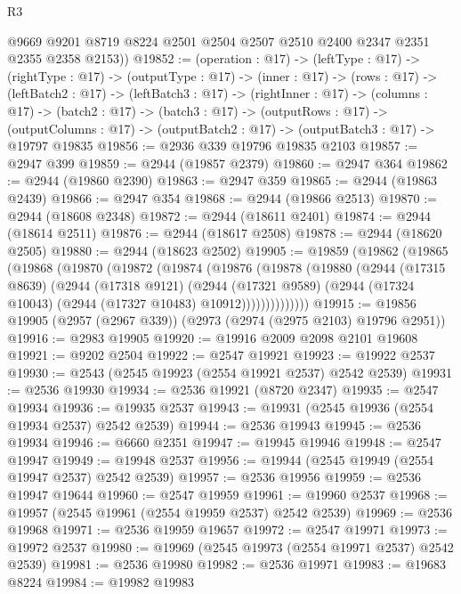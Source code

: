 \begin{lexlean}{R3}
\begin{coremodule}
        @9669
        @9201
        @8719
        @8224
        @2501
        @2504
        @2507
        @2510
        @2400
        @2347
        @2351
        @2355
        @2358
        @2153))
@19852 := (operation : @17) ->
  (leftType : @17) ->
  (rightType : @17) ->
  (outputType : @17) ->
  (inner : @17) ->
  (rows : @17) ->
  (leftBatch2 : @17) ->
  (leftBatch3 : @17) ->
  (rightInner : @17) ->
  (columns : @17) ->
  (batch2 : @17) ->
  (batch3 : @17) ->
  (outputRows : @17) ->
  (outputColumns : @17) -> (outputBatch2 : @17) -> (outputBatch3 : @17) -> @19797 @19835
@19856 := @2936 @339 @19796 @19835 @2103
@19857 := @2947 @399
@19859 := @2944 (@19857 @2379)
@19860 := @2947 @364
@19862 := @2944 (@19860 @2390)
@19863 := @2947 @359
@19865 := @2944 (@19863 @2439)
@19866 := @2947 @354
@19868 := @2944 (@19866 @2513)
@19870 := @2944 (@18608 @2348)
@19872 := @2944 (@18611 @2401)
@19874 := @2944 (@18614 @2511)
@19876 := @2944 (@18617 @2508)
@19878 := @2944 (@18620 @2505)
@19880 := @2944 (@18623 @2502)
@19905 := @19859
    (@19862
      (@19865
        (@19868
          (@19870
            (@19872
              (@19874
                (@19876
                  (@19878
                    (@19880
                      (@2944
                        (@17315 @8639)
                        (@2944
                          (@17318 @9121)
                          (@2944
                            (@17321 @9589)
                            (@2944 (@17324 @10043) (@2944 (@17327 @10483) @10912))))))))))))))
@19915 := @19856 @19905 (@2957 (@2967 @339)) (@2973 (@2974 (@2975 @2103) @19796 @2951))
@19916 := @2983 @19905
@19920 := @19916 @2009 @2098 @2101 @19608
@19921 := @9202 @2504
@19922 := @2547 @19921
@19923 := @19922 @2537
@19930 := @2543 (@2545 @19923 (@2554 @19921 @2537) @2542 @2539)
@19931 := @2536 @19930
@19934 := @2536 @19921 (@8720 @2347)
@19935 := @2547 @19934
@19936 := @19935 @2537
@19943 := @19931 (@2545 @19936 (@2554 @19934 @2537) @2542 @2539)
@19944 := @2536 @19943
@19945 := @2536 @19934
@19946 := @6660 @2351
@19947 := @19945 @19946
@19948 := @2547 @19947
@19949 := @19948 @2537
@19956 := @19944 (@2545 @19949 (@2554 @19947 @2537) @2542 @2539)
@19957 := @2536 @19956
@19959 := @2536 @19947 @19644
@19960 := @2547 @19959
@19961 := @19960 @2537
@19968 := @19957 (@2545 @19961 (@2554 @19959 @2537) @2542 @2539)
@19969 := @2536 @19968
@19971 := @2536 @19959 @19657
@19972 := @2547 @19971
@19973 := @19972 @2537
@19980 := @19969 (@2545 @19973 (@2554 @19971 @2537) @2542 @2539)
@19981 := @2536 @19980
@19982 := @2536 @19971
@19983 := @19683 @8224
@19984 := @19982 @19983

\end{coremodule}
\end{lexlean}
